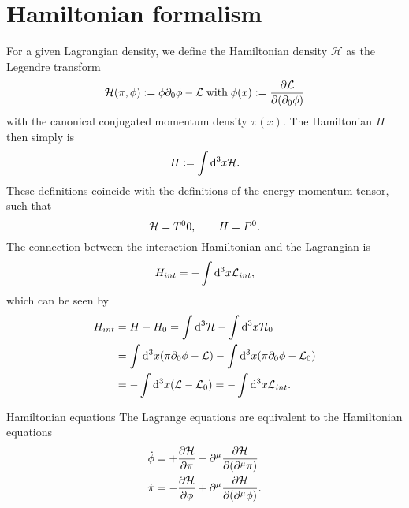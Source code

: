 \section{Hamiltonian formalism}
For a given Lagrangian density, we define the Hamiltonian density $\mathcal{H}$ as the Legendre transform
\begin{equation}
	\mathcal{H}(\pi,\phi):= \phi \partial_0 \phi - \mathcal{L} \; \mathrm{with} \; \phi(x):= \frac{\partial \mathcal{L}}{\partial(\partial_0 \phi)}
\end{equation}
with the canonical conjugated momentum density $\pi(x)$. The Hamiltonian $H$ then simply is
\begin{equation}
	H:= \int \mathrm{d}^3 x \mathcal{H}.
\end{equation}
These definitions coincide with the definitions of the energy momentum tensor, such that
\begin{equation}
	\mathcal{H}=T^00, \qquad H=P^0.
\end{equation}
The connection between the interaction Hamiltonian and the Lagrangian is
\begin{equation}
	\label{eq:interactingHamiltonian}
	H_{int} = - \int \mathrm{d}^3 x \mathcal{L}_{int},
	\end{equation}
	which can be seen by
	\begin{align*}
		H_{int}& = H-H_0 = \int \mathrm{d}^3 \mathcal{H} - \int \mathrm{d}^3x \mathcal{H}_0\\
		&= \int \mathrm{d}^3 x (\pi \partial_0 \phi -\mathcal{L}) - \int \mathrm{d}^3 x(\pi \partial_0 \phi-\mathcal{L}_0) \\
		&= -\int \mathrm{d}^3x (\mathcal{L}-\mathcal{L}_0) = - \int \mathrm{d}^3 x \mathcal{L}_{int}.
	\end{align*}


\begin{mybox}{Hamiltonian equations}
The Lagrange equations are equivalent to the Hamiltonian equations
\begin{align}
	\label{eq:Hamiltoneq}
	\dot{\phi}&= +\frac{\partial \mathcal{H}}{\partial \pi} - \partial^\mu \frac{\partial \mathcal{H}}{\partial(\partial^\mu \pi)}\\
	\dot{\pi} &= - \frac{\partial \mathcal{H}}{\partial \phi} + \partial^\mu \frac{\partial \mathcal{H}}{\partial(\partial^\mu \phi)}.
\end{align}
\end{mybox}
